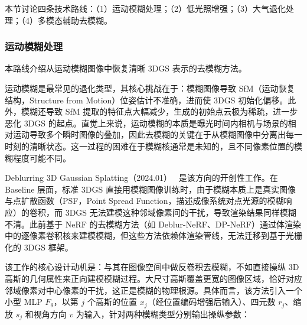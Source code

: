 本节讨论四条技术路线：（1）运动模糊处理；（2）低光照增强；（3）大气退化处理；（4）多模态辅助去模糊。

\subsubsection{运动模糊处理}

本路线介绍从运动模糊图像中恢复清晰 3DGS 表示的去模糊方法。

运动模糊是最常见的退化类型，其核心挑战在于：模糊图像导致 SfM（运动恢复结构，Structure from Motion）位姿估计不准确，进而使 3DGS 初始化偏移。此外，模糊还导致 SfM 提取的特征点大幅减少，生成的初始点云极为稀疏，进一步恶化 3DGS 的起点。直觉上来说，运动模糊的本质是曝光时间内相机与场景的相对运动导致多个瞬时图像的叠加，因此去模糊的关键在于从模糊图像中分离出每一时刻的清晰状态。这一过程的困难在于模糊核通常是未知的，且不同像素位置的模糊程度可能不同。

Deblurring 3D Gaussian Splatting（2024.01）~\cite{2401_00834} 是该方向的开创性工作。在 Baseline 层面，标准 3DGS 直接用模糊图像训练时，由于模糊本质上是真实图像与点扩散函数（PSF，Point Spread Function，描述成像系统对点光源的模糊响应）的卷积，而 3DGS 无法建模这种邻域像素间的干扰，导致渲染结果同样模糊不清。此前基于 NeRF 的去模糊方法（如 Deblur-NeRF、DP-NeRF）通过体渲染中的逐像素卷积核来建模模糊，但这些方法依赖体渲染管线，无法迁移到基于光栅化的 3DGS 框架。

该工作的核心设计动机是：与其在图像空间中做反卷积去模糊，不如直接操纵 3D 高斯的几何属性来正向建模模糊过程。大尺寸高斯覆盖更宽的图像区域，恰好对应邻域像素对中心像素的干扰，这正是模糊的物理根源。具体而言，该方法引入一个小型 MLP $F_\theta$，以第 $j$ 个高斯的位置 $x_j$（经位置编码增强后输入）、四元数 $r_j$、缩放 $s_j$ 和视角方向 $v$ 为输入，针对两种模糊类型分别输出操纵参数：

